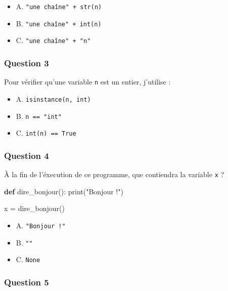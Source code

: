 \documentclass[
]{article}
\newenvironment{Shaded}{}{}
\newcommand{\BuiltInTok}[1]{#1}
\newcommand{\KeywordTok}[1]{\textcolor[rgb]{0.00,0.44,0.13}{\textbf{#1}}}
\newcommand{\NormalTok}[1]{#1}
\newcommand{\OperatorTok}[1]{\textcolor[rgb]{0.40,0.40,0.40}{#1}}
\newcommand{\StringTok}[1]{\textcolor[rgb]{0.25,0.44,0.63}{#1}}
\providecommand{\tightlist}{%
  \setlength{\itemsep}{0pt}\setlength{\parskip}{0pt}}
\begin{document}
\begin{itemize}
\tightlist
\item
  A. \texttt{"une\ chaîne"\ +\ str(n)}
\item
  B. \texttt{"une\ chaîne"\ +\ int(n)}
\item
  C. \texttt{"une\ chaîne"\ +\ "n"}
\end{itemize}

\hypertarget{question-3}{%
\subsubsection{Question 3}\label{question-3}}

Pour vérifier qu'une variable \texttt{n} est un entier, j'utilise :

\begin{itemize}
\tightlist
\item
  A. \texttt{isinstance(n,\ int)}
\item
  B. \texttt{n\ ==\ "int"}
\item
  C. \texttt{int(n)\ ==\ True}
\end{itemize}

\hypertarget{question-4}{%
\subsubsection{Question 4}\label{question-4}}

À la fin de l'éxecution de ce programme, que contiendra la variable
\texttt{x} ?

\begin{Shaded}
\begin{Highlighting}[]
\KeywordTok{def}\NormalTok{ dire_bonjour():}
    \BuiltInTok{print}\NormalTok{(}\StringTok{"Bonjour !"}\NormalTok{)}

\NormalTok{x }\OperatorTok{=}\NormalTok{ dire_bonjour()}
\end{Highlighting}
\end{Shaded}

\begin{itemize}
\tightlist
\item
  A. \texttt{"Bonjour\ !"}
\item
  B. \texttt{""}
\item
  C. \texttt{None}
\end{itemize}

\hypertarget{question-5}{%
\subsubsection{Question 5}\label{question-5}}
\end{document}
